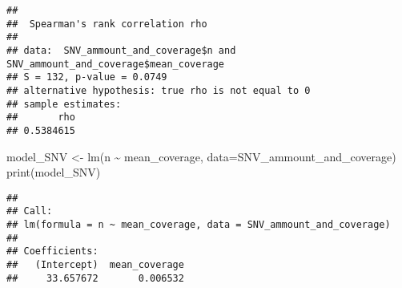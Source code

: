 \documentclass[
]{article}
\newenvironment{Shaded}{\begin{snugshade}}{\end{snugshade}}
\newcommand{\AttributeTok}[1]{\textcolor[rgb]{0.77,0.63,0.00}{#1}}
\newcommand{\FunctionTok}[1]{\textcolor[rgb]{0.00,0.00,0.00}{#1}}
\newcommand{\NormalTok}[1]{#1}
\newcommand{\OtherTok}[1]{\textcolor[rgb]{0.56,0.35,0.01}{#1}}
\newcommand{\SpecialCharTok}[1]{\textcolor[rgb]{0.00,0.00,0.00}{#1}}
\begin{document}
\begin{verbatim}
## 
##  Spearman's rank correlation rho
## 
## data:  SNV_ammount_and_coverage$n and SNV_ammount_and_coverage$mean_coverage
## S = 132, p-value = 0.0749
## alternative hypothesis: true rho is not equal to 0
## sample estimates:
##       rho 
## 0.5384615
\end{verbatim}

\begin{Shaded}
\begin{Highlighting}[]
\NormalTok{model\_SNV }\OtherTok{\textless{}{-}} \FunctionTok{lm}\NormalTok{(n }\SpecialCharTok{\textasciitilde{}}\NormalTok{ mean\_coverage, }\AttributeTok{data=}\NormalTok{SNV\_ammount\_and\_coverage)}
\FunctionTok{print}\NormalTok{(model\_SNV)}
\end{Highlighting}
\end{Shaded}

\begin{verbatim}
## 
## Call:
## lm(formula = n ~ mean_coverage, data = SNV_ammount_and_coverage)
## 
## Coefficients:
##   (Intercept)  mean_coverage  
##     33.657672       0.006532
\end{verbatim}
\end{document}
